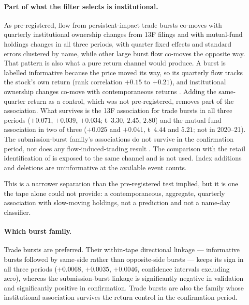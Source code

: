 \documentclass[11pt]{article}
\begin{document}
\paragraph{Part of what the filter selects is institutional.} As pre-registered, flow from
persistent-impact trade bursts co-moves with quarterly institutional ownership changes from 13F
filings and with mutual-fund holdings changes in all three periods, with quarter fixed effects and
standard errors clustered by name, while other large burst flow co-moves the opposite way. That
pattern is also what a pure return channel would produce. A burst is labelled informative because
the price moved its way, so its quarterly flow tracks the stock's own return (rank correlation
$+0.15$ to $+0.21$), and institutional ownership changes co-move with contemporaneous returns
\citep{sias2006}. Adding the same-quarter return as a control, which was not pre-registered,
removes part of the association. What survives is the 13F association for trade bursts in all three
periods ($+0.071$, $+0.039$, $+0.034$; t~$3.30$, $2.45$, $2.80$) and the mutual-fund association in
two of three ($+0.025$ and $+0.041$, t~$4.44$ and $5.21$; not in 2020--21). The submission-burst
family's associations do not survive in the confirmation period, nor does any flow-induced-trading
result \citep{lou2012}. The comparison with the retail identification of \citet{boehmer2021} is
exposed to the same channel and is not used. Index additions and deletions are uninformative at the
available event counts.

This is a narrower separation than the pre-registered test implied, but it is one the tape alone
could not provide: a contemporaneous, aggregate, quarterly association with slow-moving holdings,
not a prediction and not a name-day classifier.

\paragraph{Which burst family.} Trade bursts are preferred. Their within-tape directional linkage
--- informative bursts followed by same-side rather than opposite-side bursts --- keeps its sign in
all three periods ($+0.0068$, $+0.0035$, $+0.0046$, confidence intervals excluding zero), whereas
the submission-burst linkage is significantly negative in validation and significantly positive in
confirmation. Trade bursts are also the family whose institutional association survives the return
control in the confirmation period.
\end{document}
